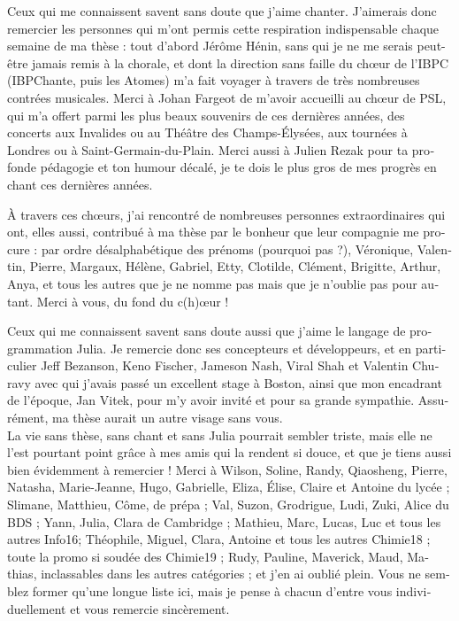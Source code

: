 \begin{otherlanguage}{french}
Ceux qui me connaissent savent sans doute que j'aime chanter. J'aimerais donc remercier les personnes qui m'ont permis cette respiration indispensable chaque semaine de ma thèse : tout d'abord Jérôme Hénin, sans qui je ne me serais peut-être jamais remis à la chorale, et dont la direction sans faille du chœur de l'IBPC (IBPChante, puis les Atomes) m'a fait voyager à travers de très nombreuses contrées musicales. Merci à Johan Fargeot de m'avoir accueilli au chœur de PSL, qui m'a offert parmi les plus beaux souvenirs de ces dernières années, des concerts aux Invalides ou au Théâtre des Champs-Élysées, aux tournées à Londres ou à Saint-Germain-du-Plain. Merci aussi à Julien Rezak pour ta profonde pédagogie et ton humour décalé, je te dois le plus gros de mes progrès en chant ces dernières années.

À travers ces chœurs, j'ai rencontré de nombreuses personnes extraordinaires qui ont, elles aussi, contribué à ma thèse par le bonheur que leur compagnie me procure : par ordre désalphabétique des prénoms (pourquoi pas ?), Véronique, Valentin, Pierre, Margaux, Hélène, Gabriel, Etty, Clotilde, Clément, Brigitte, Arthur, Anya, et tous les autres que je ne nomme pas mais que je n'oublie pas pour autant. Merci à vous, du fond du c(h)œur !

Ceux qui me connaissent savent sans doute aussi que j'aime le langage de programmation Julia. Je remercie donc ses concepteurs et développeurs, et en particulier Jeff Bezanson, Keno Fischer, Jameson Nash, Viral Shah et Valentin Churavy avec qui j'avais passé un excellent stage à Boston, ainsi que mon encadrant de l'époque, Jan Vitek, pour m'y avoir invité et pour sa grande sympathie. Assurément, ma thèse aurait un autre visage sans vous.\\

La vie sans thèse, sans chant et sans Julia pourrait sembler triste, mais elle ne l'est pourtant point grâce à mes amis qui la rendent si douce, et que je tiens aussi bien évidemment à remercier ! Merci à Wilson, Soline, Randy, Qiaosheng, Pierre, Natasha, Marie-Jeanne, Hugo, Gabrielle, Eliza, Élise, Claire et Antoine du lycée ; Slimane, Matthieu, Côme, de prépa ; Val, Suzon, Grodrigue, Ludi, Zuki, Alice du BDS ; Yann, Julia, Clara de Cambridge ; Mathieu, Marc, Lucas, Luc et tous les autres Info16; Théophile, Miguel, Clara, Antoine et tous les autres Chimie18 ; toute la promo si soudée des Chimie19 ; Rudy, Pauline, Maverick, Maud, Mathias, inclassables dans les autres catégories ; et j'en ai oublié plein. Vous ne semblez former qu'une longue liste ici, mais je pense à chacun d'entre vous individuellement et vous remercie sincèrement.


\end{otherlanguage}
